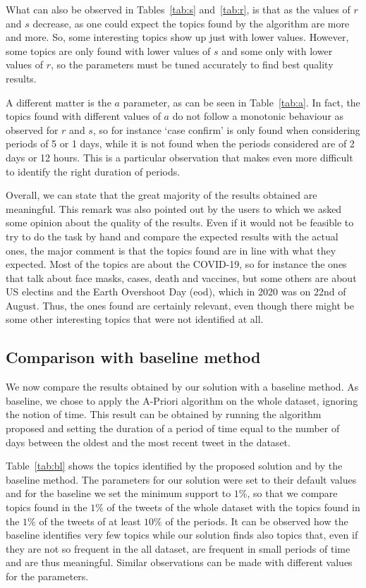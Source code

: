 What can also be observed in Tables~\ref{tab:s} and~\ref{tab:r}, is that as the values of $r$ and $s$ decrease,
as one could expect the
topics found by the algorithm are more and more. So, some interesting topics show up just with lower
values. However, some topics are only found with lower values of $s$ and some only with lower values 
of $r$, so the parameters must be tuned accurately to find best quality results.

A different matter is the $a$ parameter, as can be seen in Table~\ref{tab:a}. In fact, the topics found 
with different values of $a$ do not follow a monotonic behaviour as observed for $r$ and $s$, so for 
instance `case confirm' is only found when considering periods of 5 or 1 days, while it is not found
when the periods considered are of 2 days or 12 hours. This is a particular observation that makes 
even more difficult to identify the right duration of periods. 

Overall, we can state that the great majority of the results obtained are meaningful. 
This remark was also pointed out by the users to which we asked some opinion 
about the quality of the results. Even if it would not be feasible to try to do the task by hand and 
compare the expected results with the actual ones, the major comment is that the 
topics found are in line with what they expected.
Most of the topics are about the COVID-19, so for instance the ones that talk 
about face masks, cases, death and vaccines, but some others are about US electins and 
the Earth Overshoot Day (eod), which in 2020 was on 22nd of August. Thus, the ones found are 
certainly relevant, even though there might be some other interesting topics that were not
identified at all.

\subsection{Comparison with baseline method}

We now compare the results obtained by our solution with a baseline method. As baseline, 
we chose to apply the A-Priori algorithm on the whole dataset, ignoring the notion of time. 
This result can be obtained by running the algorithm proposed and  
setting the duration of a period of time equal to the number of days between the oldest 
and the most recent tweet in the dataset.

Table~\ref{tab:bl} shows the topics identified by the proposed solution and by the 
baseline method. The parameters for our solution were set to their default values 
and for the baseline we set the minimum support to $1\%$, so that we compare 
topics found in the $1\%$ of the tweets of the whole dataset with the topics found 
in the $1\%$ of the tweets of at least $10\%$ of the periods. 
It can be observed how the baseline identifies very few topics while our solution 
finds also topics that, even if they are not so frequent in the all dataset, are 
frequent in small periods of time and are thus meaningful. Similar observations 
can be made with different values for the parameters.

